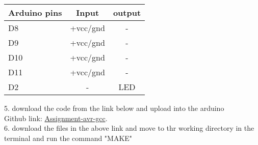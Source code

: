 \documentclass[10pt,a4paper]{report}
\begin{document}
\begin{multicols}{2}
 \begin{center}
 \setlength{\arrayrulewidth}{0.5mm}
\setlength{\tabcolsep}{15pt}
\renewcommand{\arraystretch}{1.5}
    \begin{tabular}{|l|c|c|}
    \hline 
    \textbf{Arduino pins} & \textbf{Input} & \textbf{output} \\
    \hline
    D8 & +vcc/gnd & -\\
    D9 & +vcc/gnd & -\\
    D10 & +vcc/gnd & -\\
    D11 & +vcc/gnd & -\\
    D2 & - & LED\\
    \hline
      \end{tabular}
  \end{center}
\raggedright 5. download the code from the link below and upload into the arduino\\
Github link: \href{https://github.com/lakshmikamakshi/FWC/tree/main/assignment_avr_gcc}{Assignment-avr-gcc}.
\\6. download the files in the above link and move to thr working directory in the terminal and run the command "MAKE"



\end{multicols}
\end{document}
